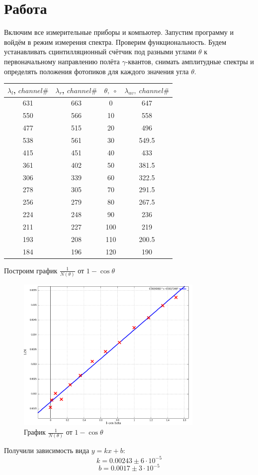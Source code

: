 \documentclass{article}
\begin{document}
\section{Работа}
Включим все измерительные приборы и компьютер.
Запустим программу и войдём в режим измерения спектра. Проверим функциональность.
Будем устанавливать сцинтилляционный счётчик под разными углами \(\theta\) к первоначальному направлению
полёта \(\gamma\)-квантов, снимать амплитудные спектры и определять положения фотопиков для каждого значения
угла \(\theta\).

\begin{table}[!ht]
    \centering
    \begin{tabular}{|c|c|c|c|}
    \hline
				\(\lambda_{l}\), \(channel \#\) & \(\lambda_{r}\), \(channel \#\) & \(\theta,\; \circ\) & \(\lambda_{av},\; channel \#\) \\ \hline
        631 & 663 & 0 & 647 \\ \hline
        550 & 566 & 10 & 558 \\ \hline
        477 & 515 & 20 & 496 \\ \hline
        538 & 561 & 30 & 549.5 \\ \hline
        415 & 451 & 40 & 433 \\ \hline
        361 & 402 & 50 & 381.5 \\ \hline
        306 & 339 & 60 & 322.5 \\ \hline
        278 & 305 & 70 & 291.5 \\ \hline
        256 & 279 & 80 & 267.5 \\ \hline
				224 & 248 & 90 & 236 \\ \hline
        211 & 227 & 100 & 219 \\ \hline
        193 & 208 & 110 & 200.5 \\ \hline
        184 & 196 & 120 & 190 \\ \hline
		\end{tabular}
\end{table}

Построим график \(\frac{1}{N\left(\theta\right)}\) от \(1-\cos{\theta}\)
\begin{figure}[H]
  \centering
  \includegraphics[width=0.8\textwidth]{1.png}
	\caption{График \(\frac{1}{N\left(\theta\right)}\) от \(1-\cos{\theta}\)}
\end{figure}
Получили зависимость вида \(y = kx + b\):
\[ k = 0.00243 \pm 6\cdot 10^{-5}\]
\[ b = 0.0017 \pm 3\cdot 10^{-5} \]
\end{document}
